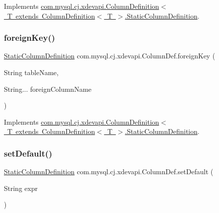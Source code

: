 Implements \mbox{\hyperlink{interfacecom_1_1mysql_1_1cj_1_1xdevapi_1_1_column_definition_1_1_static_column_definition_acc7d2520272cb72fb38d458464886995}{com.\+mysql.\+cj.\+xdevapi.\+Column\+Definition$<$ T extends Column\+Definition$<$ T $>$.\+Static\+Column\+Definition}}.

\mbox{\label{classcom_1_1mysql_1_1cj_1_1xdevapi_1_1_column_def_a55fde7312a45fd6dc7bca76406c018cd}} 
\subsubsection{\texorpdfstring{foreign\+Key()}{foreignKey()}}
{\footnotesize\ttfamily \mbox{\hyperlink{interfacecom_1_1mysql_1_1cj_1_1xdevapi_1_1_column_definition_1_1_static_column_definition}{Static\+Column\+Definition}} com.\+mysql.\+cj.\+xdevapi.\+Column\+Def.\+foreign\+Key (\begin{DoxyParamCaption}\item[{String}]{table\+Name,  }\item[{String...}]{foreign\+Column\+Name }\end{DoxyParamCaption})}



Implements \mbox{\hyperlink{interfacecom_1_1mysql_1_1cj_1_1xdevapi_1_1_column_definition_1_1_static_column_definition_a38a6faaed72d2f87e2d724da689fe8d2}{com.\+mysql.\+cj.\+xdevapi.\+Column\+Definition$<$ T extends Column\+Definition$<$ T $>$.\+Static\+Column\+Definition}}.

\mbox{\label{classcom_1_1mysql_1_1cj_1_1xdevapi_1_1_column_def_a2c34dd13c55b62ebb84e7c98a0d01ad3}} 
\subsubsection{\texorpdfstring{set\+Default()}{setDefault()}}
{\footnotesize\ttfamily \mbox{\hyperlink{interfacecom_1_1mysql_1_1cj_1_1xdevapi_1_1_column_definition_1_1_static_column_definition}{Static\+Column\+Definition}} com.\+mysql.\+cj.\+xdevapi.\+Column\+Def.\+set\+Default (\begin{DoxyParamCaption}\item[{String}]{expr }\end{DoxyParamCaption})}




